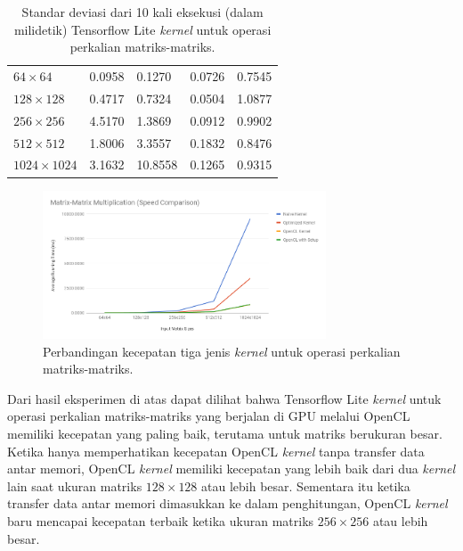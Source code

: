 \begin{table}
	\centering
	\caption{Standar deviasi dari 10 kali eksekusi (dalam milidetik) Tensorflow Lite \textit{kernel} untuk operasi perkalian matriks-matriks.}
	\label{tab:matmatmuldev}
	\begin{tabular}{|>{\small}R{2.5cm}|>{\small}R{2.1cm}|>{\small}R{2.1cm}|>{\small}R{2.1cm}|>{\small}R{2.4cm}|}
	\hline
	 & 
	 & 
	 & 
	 & 
	 \\
	\hline
		$64 \times 64$ & 0.0958 & 0.1270 & 0.0726 & 0.7545
		\\
		\hline
		$128 \times 128$ & 0.4717 & 0.7324 & 0.0504 & 1.0877
		\\
		\hline
		$256 \times 256$ & 4.5170 & 1.3869 & 0.0912 & 0.9902
		\\
		\hline
		$512 \times 512$ & 1.8006 & 3.3557 & 0.1832 & 0.8476
		\\
		\hline
		$1024 \times 1024$ & 3.1632 & 10.8558 & 0.1265 & 0.9315
		\\
		\hline
	\end{tabular}
\end{table}

\begin{figure}
	\centering
	\includegraphics[width=0.75\textwidth]
	{pics/matmatmul.png}
	\caption{Perbandingan kecepatan tiga jenis \textit{kernel} untuk operasi perkalian matriks-matriks.}
	\label{fig:matmatmul}
\end{figure}

Dari hasil eksperimen di atas dapat dilihat bahwa Tensorflow Lite \textit{kernel} untuk operasi perkalian matriks-matriks yang berjalan di GPU melalui OpenCL memiliki kecepatan yang paling baik, terutama untuk matriks berukuran besar. Ketika hanya memperhatikan kecepatan OpenCL \textit{kernel} tanpa transfer data antar memori, OpenCL \textit{kernel} memiliki kecepatan yang lebih baik dari dua \textit{kernel} lain saat ukuran matriks $128 \times 128$ atau lebih besar. Sementara itu ketika transfer data antar memori dimasukkan ke dalam penghitungan, OpenCL \textit{kernel} baru mencapai kecepatan terbaik ketika ukuran matriks $256 \times 256$ atau lebih besar.

